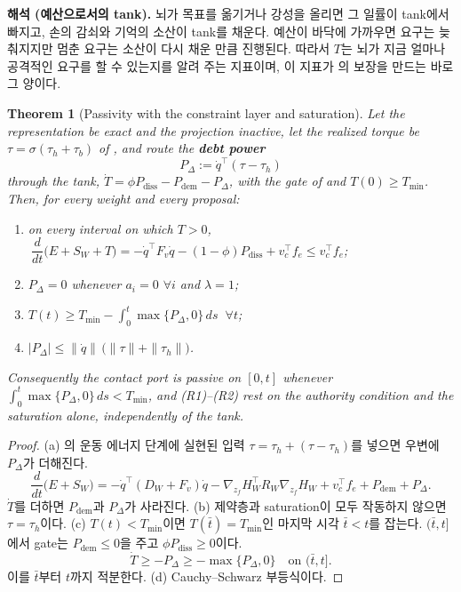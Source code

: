 \documentclass[11pt]{article}\usepackage[margin=1in]{geometry}\usepackage{amsmath,amssymb,amsthm,mathtools}\usepackage{graphicx}\graphicspath{{figures/}{../figures/}{figs/}{./}}\usepackage{enumitem}\usepackage{hyperref}\usepackage{cleveref}\usepackage{tikz}\usetikzlibrary{arrows.meta,positioning,calc,shapes.geometric}\usepackage{float}\usepackage{rotating}\usepackage[most]{tcolorbox}\usepackage{kotex}\usepackage{booktabs}\usepackage{longtable}\emergencystretch=1.6em\tolerance=2000 \crefname{assumption}{Assumption}{Assumptions}\Crefname{assumption}{Assumption}{Assumptions}\crefname{definition}{Definition}{Definitions}\Crefname{definition}{Definition}{Definitions}\crefname{proposition}{Proposition}{Propositions}\Crefname{proposition}{Proposition}{Propositions}\crefname{fact}{Fact}{Facts}\Crefname{fact}{Fact}{Facts} \newtheorem{assumption}{Assumption}\newtheorem{definition}{Definition}\newtheorem{lemma}{Lemma}\newtheorem{proposition}{Proposition}\newtheorem{theorem}{Theorem}\newtheorem{corollary}{Corollary}\newtheorem{fact}{Fact}\theoremstyle{remark}\newtheorem{remark}{Remark} \newcommand{\R}{\mathbb{R}}\newcommand{\xb}{\bar x}\newcommand{\Ab}{\bar A}\newcommand{\By}{\bar B_y}\newcommand{\U}{\mathcal U}\newcommand{\Z}{\mathcal Z}
\begin{document}
\textbf{해석 (예산으로서의 tank).} 뇌가 목표를 옮기거나 강성을 올리면 그 일률이 tank에서 빠지고, 손의 감쇠와 기억의 소산이 tank를 채운다. 예산이 바닥에 가까우면 요구는 늦춰지지만 멈춘 요구는 소산이 다시 채운 만큼 진행된다. 따라서 $T$는 뇌가 지금 얼마나 공격적인 요구를 할 수 있는지를 알려 주는 지표이며, 이 지표가 의 보장을 만드는 바로 그 양이다.


\begin{theorem}[Passivity with the constraint layer and saturation]
\label{thm:r7}
Let the representation be exact and the projection inactive, let the realized torque be $\tau=\sigma(\tau_h+\tau_b)$ of , and route the \textbf{\emph{debt power}}
\[
P_\Delta:=\dot q^\top(\tau-\tau_h)
\]
through the tank, $\dot T=\phi P_{\mathrm{diss}}-P_{\mathrm{dem}}-P_\Delta$, with the gate of  and $T(0)\ge T_{\min}$. Then, for every weight and every proposal:
\begin{enumerate}[label=(\alph*)]
\item on every interval on which $T>0$, $\ \dfrac{d}{dt}\big(E+S_W+T\big)=-\dot q^\top F_v\dot q-(1-\phi)P_{\mathrm{diss}}+v_c^\top f_e\le v_c^\top f_e$;
\item $P_\Delta=0$ whenever $a_i=0$ $\forall i$ and $\lambda=1$;
\item $T(t)\ge T_{\min}-\displaystyle\int_0^t\max\{P_\Delta,0\}\,ds$ $\ \forall t$;
\item $|P_\Delta|\le\|\dot q\|\,\big(\|\tau\|+\|\tau_h\|\big)$.
\end{enumerate}
Consequently the contact port is passive on $[0,t]$ whenever $\int_0^t\max\{P_\Delta,0\}\,ds<T_{\min}$, and (R1)--(R2) rest on the authority condition and the saturation alone, independently of the tank.
\end{theorem}

\begin{proof}
(a) 의 운동 에너지 단계에 실현된 입력 $\tau=\tau_h+(\tau-\tau_h)$를 넣으면 우변에 $P_\Delta$가 더해진다.
\[
\frac{d}{dt}\big(E+S_W\big)=-\dot q^\top(D_W+F_v)\dot q-\nabla_{z_f}H_W^\top R_W\nabla_{z_f}H_W+v_c^\top f_e+P_{\mathrm{dem}}+P_\Delta .
\]
$\dot T$를 더하면 $P_{\mathrm{dem}}$과 $P_\Delta$가 사라진다. (b) 제약층과 saturation이 모두 작동하지 않으면 $\tau=\tau_h$이다. (c) $T(t)<T_{\min}$이면 $T(\bar t)=T_{\min}$인 마지막 시각 $\bar t<t$를 잡는다. $(\bar t,t]$에서 gate는 $P_{\mathrm{dem}}\le0$을 주고 $\phi P_{\mathrm{diss}}\ge0$이다.
\[
\dot T\ge-P_\Delta\ge-\max\{P_\Delta,0\}\quad\text{on }(\bar t,t] .
\]
이를 $\bar t$부터 $t$까지 적분한다. (d) Cauchy--Schwarz 부등식이다.
\end{proof}
\end{document}

